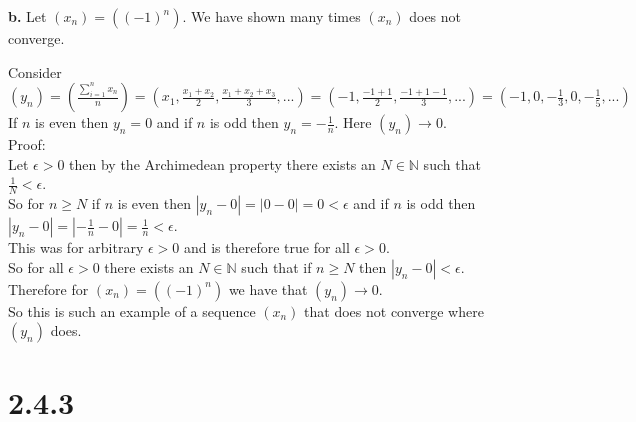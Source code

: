 \documentclass{article}
\begin{document}
{\Large \textbf{b.}} Let $(x_n) = ((-1)^n)$. We have shown many times $(x_n)$ does not converge.
\begin{center}
    \doublespacing
    Consider $(y_n) = (\frac{\sum _{i=1}^n x_n}{n}) = (x_1,\frac{x_1 + x_2}{2},\frac{x_1 + x_2 + x_3}{3}, ...) = (-1,\frac{-1 + 1}{2},\frac{-1 + 1 -1}{3}, ...) = (-1, 0, -\frac{1}{3}, 0, -\frac{1}{5}, ...)$
    \\If $n$ is even then $y_n = 0$ and if $n$ is odd then $y_n = -\frac{1}{n}$. Here $(y_n)\rightarrow 0$.
    \\Proof:
    \\Let $\epsilon > 0$ then by the Archimedean property there exists an $N\in\mathbb{N}$ such that $\frac{1}{N} <\epsilon$.
    \\So for $n\geq N$ if $n$ is even then $|y_n - 0| = |0 - 0| = 0 <\epsilon$ and if $n$ is odd then $|y_n - 0| = |-\frac{1}{n} - 0| = \frac{1}{n} <\epsilon$.
    \\This was for arbitrary $\epsilon > 0$ and is therefore true for all $\epsilon > 0$.
    \\So for all $\epsilon > 0$ there exists an $N\in\mathbb{N}$ such that if $n\geq N$ then $|y_n - 0| <\epsilon$.
    \\Therefore for $(x_n) = ((-1)^n)$ we have that $(y_n)\rightarrow 0$.
    \\So this is such an example of a sequence $(x_n)$ that does not converge where $(y_n)$ does.
\end{center}


\newpage
\section*{2.4.3}
\end{document}
